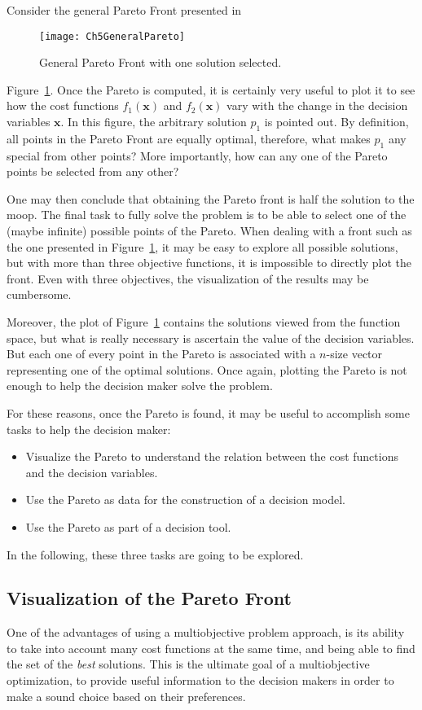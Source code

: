 Consider the general Pareto Front presented in 
\begin{figure}[b]
	\centering
	\texttt{[image: Ch5GeneralPareto]}
	\caption{General Pareto Front with one solution selected.}
	\label{fig:Ch5GeneralPareto}
\end{figure}
%
Figure~\ref{fig:Ch5GeneralPareto}. Once the Pareto is computed, it is certainly very useful to plot it to see how the cost functions $f_1(\mathbf{x})$ and $f_2(\mathbf{x})$ vary with the change in the decision variables $\mathbf{x}$. In this figure, the arbitrary solution $p_1$ is pointed out. By definition, all points in the Pareto Front are equally optimal, therefore, what makes $p_1$ any special from other points? More importantly, how can any one of the Pareto points be selected from any other?

One may then conclude that obtaining the Pareto front is half the solution to the \gls{moop}. The final task to fully solve the problem is to be able to select one of the (maybe infinite) possible points of the Pareto. When dealing with a front such as the one presented in Figure~\ref{fig:Ch5GeneralPareto}, it may be easy to explore all possible solutions, but with more than three objective functions, it is impossible to directly plot the front. Even with three objectives, the visualization of the results may be cumbersome.

Moreover, the plot of Figure~\ref{fig:Ch5GeneralPareto} contains the solutions viewed from the function space, but what is really necessary is ascertain the value of the decision variables. But each one of every point in the Pareto is associated with a $n$-size vector representing one of the optimal solutions. Once again, plotting the Pareto is not enough to help the decision maker solve the problem.

For these reasons, once the Pareto is found, it may be useful to accomplish some tasks to help the decision maker:
\begin{itemize}
	\item  Visualize the Pareto to understand the relation between the cost functions and the decision variables.
	\item Use the Pareto as data for the construction of a decision model.
	\item Use the Pareto as part of a decision tool.
\end{itemize}
In the following, these three tasks are going to be explored.
%
\subsection{Visualization of the Pareto Front}
\label{sec:ParetoVisualization}
%
One of the advantages of using a multiobjective problem approach, is its ability to take into account many cost functions at the same time, and being able to find the set of the \emph{best} solutions. This is the ultimate goal of a multiobjective optimization, to provide useful information to the decision makers in order to make a sound choice based on their preferences.

